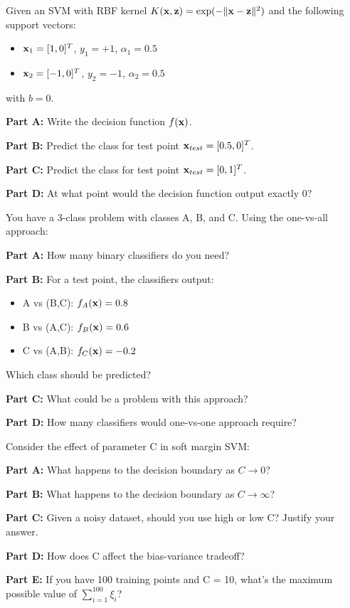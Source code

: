 \documentclass{article}
\newcounter{exercise}
\begin{document}
\begin{tcolorbox}[colback=blue!5!white,colframe=blue!75!black,title=Exercise \theexercise: Prediction with Kernels]
Given an SVM with RBF kernel $K(\mathbf{x}, \mathbf{z}) = \exp(-\|\mathbf{x} - \mathbf{z}\|^2)$ and the following support vectors:
\begin{itemize}
    \item $\mathbf{x}_1 = [1, 0]^T$, $y_1 = +1$, $\alpha_1 = 0.5$
    \item $\mathbf{x}_2 = [-1, 0]^T$, $y_2 = -1$, $\alpha_2 = 0.5$
\end{itemize}
with $b = 0$.

\textbf{Part A:} Write the decision function $f(\mathbf{x})$.

\textbf{Part B:} Predict the class for test point $\mathbf{x}_{test} = [0.5, 0]^T$.

\textbf{Part C:} Predict the class for test point $\mathbf{x}_{test} = [0, 1]^T$.

\textbf{Part D:} At what point would the decision function output exactly 0?
\end{tcolorbox}

\begin{tcolorbox}[colback=blue!5!white,colframe=blue!75!black,title=Exercise \theexercise: Multi-class SVM]
You have a 3-class problem with classes A, B, and C. Using the one-vs-all approach:

\textbf{Part A:} How many binary classifiers do you need?

\textbf{Part B:} For a test point, the classifiers output:
\begin{itemize}
    \item A vs (B,C): $f_A(\mathbf{x}) = 0.8$
    \item B vs (A,C): $f_B(\mathbf{x}) = 0.6$
    \item C vs (A,B): $f_C(\mathbf{x}) = -0.2$
\end{itemize}
Which class should be predicted?

\textbf{Part C:} What could be a problem with this approach?

\textbf{Part D:} How many classifiers would one-vs-one approach require?
\end{tcolorbox}

\begin{tcolorbox}[colback=blue!5!white,colframe=blue!75!black,title=Exercise \theexercise: Regularization Parameter C]
Consider the effect of parameter C in soft margin SVM:

\textbf{Part A:} What happens to the decision boundary as $C \rightarrow 0$?

\textbf{Part B:} What happens to the decision boundary as $C \rightarrow \infty$?

\textbf{Part C:} Given a noisy dataset, should you use high or low C? Justify your answer.

\textbf{Part D:} How does C affect the bias-variance tradeoff?

\textbf{Part E:} If you have 100 training points and C = 10, what's the maximum possible value of $\sum_{i=1}^{100} \xi_i$?
\end{tcolorbox}
\end{document}
